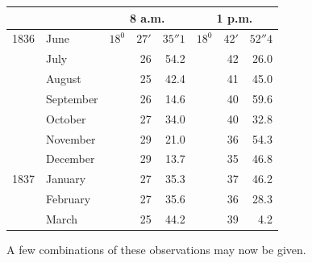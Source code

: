\begin{center}\small
\begin{tabular}{rl|rrr|rrr}
&&\multicolumn{3}{c|}{8 a.m.}&\multicolumn{3}{c}{1 p.m.}\\\hline
1836&June&$18^0$&$27'$&$35''1$&$18^0$&$42'$&$52''4$\\
&July&&26&54.2&&42&26.0\\
&August&&25&42.4&&41&45.0\\
&September&&26&14.6&&40&59.6\\
&October&&27&34.0&&40&32.8\\
&November&&29&21.0&&36&54.3\\
&December&&29&13.7&&35&46.8\\[4pt]
1837&January&&27&35.3&&37&46.2\\
&February&&27&35.6&&36&28.3\\
&March&&25&44.2&&39&4.2
\end{tabular}
\end{center}

A few combinations of these observations may now be given.

